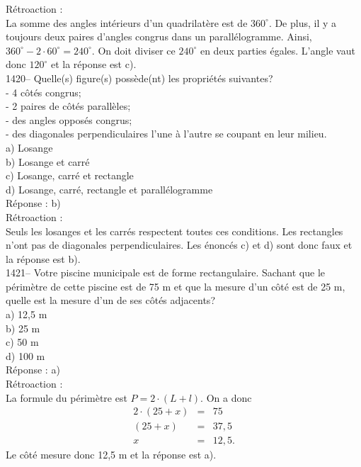 R\'etroaction :\\
La somme des angles int\'erieurs d'un quadrilat\`ere est de
$360^\circ$. De plus, il y a toujours deux paires d'angles congrus
dans un parall\'elogramme. Ainsi,
$360^\circ-2\cdot60^\circ=240^\circ$. On doit diviser ce $240^\circ$
en deux
parties \'egales. L'angle vaut donc $120^\circ$ et la r\'eponse est c).\\

1420-- Quelle(s) figure(s) poss\`ede(nt) les propri\'et\'es suivantes?\\

- 4 c\^ot\'es congrus;\\
- 2 paires de c\^ot\'es parall\`eles;\\
- des angles oppos\'es congrus;\\
- des diagonales perpendiculaires l'une \`a l'autre se coupant en
leur milieu.\\

a) Losange\\
b) Losange et carr\'e\\
c) Losange, carr\'e et rectangle\\
d) Losange, carr\'e, rectangle et parall\'elogramme\\

R\'eponse : b)\\

R\'etroaction :\\
Seuls les losanges et les carr\'es respectent toutes ces conditions.
Les rectangles n'ont pas de diagonales perpendiculaires. Les
\'enonc\'es c) et
d) sont donc faux et la r\'eponse est b).\\

1421-- Votre piscine municipale est de forme rectangulaire. Sachant
que le p\'erim\`etre de cette piscine est de 75 m et que la mesure
d'un c\^ot\'e est
de 25 m, quelle est la mesure d'un de ses c\^ot\'es adjacents?\\
a) 12,5 m\\
b) 25 m \\
c) 50 m\\
d) 100 m\\

R\'eponse : a)\\

R\'etroaction :\\
La formule du p\'erim\`etre est  $P=2\cdot(L+l)$. On a donc
\begin{eqnarray*}
2\cdot(25+x)&=&75 \\ (25+x)&=&37,5 \\ x&=&12,5.
\end{eqnarray*}
Le c\^ot\'e mesure donc 12,5 m et la r\'eponse est a).\\


